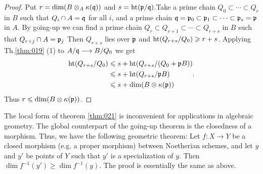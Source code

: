 \documentclass[../main]{subfiles}
\begin{document}
\begin{proof}
Put $r=\operatorname{dim}(B\otimes_A \kappa(\mathfrak{q}))$ and $s=\operatorname{ht}(\mathfrak{p}/\mathfrak{q})$.\newpage {}Take a prime chain $Q_0 \subset \cdots \subset Q_r$ in $B$ such that $Q_i \cap A=\mathfrak{q}$ for all $i$, and a prime chain $\mathfrak{q}=\mathfrak{p}_0 \subset \mathfrak{p}_1 \subset \cdots \subset\mathfrak{p}_s=\mathfrak{p}$ in $A$. By going-up we can find a prime chain $Q_r \subset Q_{r+1} \subset \cdots \subset Q_{r+s}$ in $B$ such that $Q_{r+j} \cap A=\mathfrak{p}_j$ Then $Q_{r+s}$ lies over $\mathfrak{p}$ and $\operatorname{ht}(Q_{r+s} / Q_0)\geqslant r+s$. Applying Th.\ref{thm:019} (1) to $A /\mathfrak{q} \longrightarrow B / Q_0$ we get
\[\begin{aligned}\operatorname{ht}(Q_{r+s} / Q_0) &\leqslant s+\operatorname{ht}(Q_{r+s} /(Q_0+\mathfrak{p}B))\\ &\leqslant s+\operatorname{ht}(Q_{r+s} /\mathfrak{p}B)\\ &\leqslant s+\operatorname{dim}(B \otimes \kappa(\mathfrak{p}))\end{aligned}.\] Thus $r \leqslant \operatorname{dim}(B \otimes \kappa(\mathfrak{p}))$.
\end{proof}


\begin{parremark}
The local form of theorem \ref{thm:021} is inconvenient for applications in algebraic geometry. The global counterpart of the going-up theorem is the closedness of a morphism. Thus, we have the following geometric theorem: Let $f: X\longrightarrow Y$ be a closed morphism (e.g. a proper morphism) between Noetherian schemes, and let $y$ and $y'$ be points of $Y$ such that $y'$ is a specialization of $y$. Then $\dim f^{-1}(y') \geqslant \dim f^{-1}(y)$. The proof is essentially the same as above.
\end{parremark}
\end{document}
